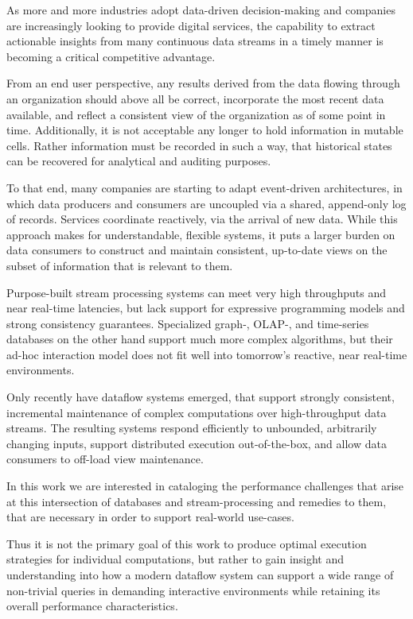 \documentclass[../index.tex]{subfiles}
\begin{document}
As more and more industries adopt data-driven decision-making and
companies are increasingly looking to provide digital services, the
capability to extract actionable insights from many continuous data
streams in a timely manner is becoming a critical competitive
advantage.

From an end user perspective, any results derived from the data
flowing through an organization should above all be correct,
incorporate the most recent data available, and reflect a consistent
view of the organization as of some point in time. Additionally, it is
not acceptable any longer to hold information in mutable cells. Rather
information must be recorded in such a way, that historical states can
be recovered for analytical and auditing purposes.

To that end, many companies are starting to adapt event-driven
architectures, in which data producers and consumers are uncoupled via
a shared, append-only log of records. Services coordinate reactively,
via the arrival of new data. While this approach makes for
understandable, flexible systems, it puts a larger burden on data
consumers to construct and maintain consistent, up-to-date views on
the subset of information that is relevant to them.

Purpose-built stream processing systems can meet very high throughputs
and near real-time latencies, but lack support for expressive
programming models and strong consistency guarantees. Specialized
graph-, OLAP-, and time-series databases on the other hand support
much more complex algorithms, but their ad-hoc interaction model does
not fit well into tomorrow's reactive, near real-time environments.

Only recently have dataflow systems emerged, that support strongly
consistent, incremental maintenance of complex computations over
high-throughput data streams. The resulting systems respond
efficiently to unbounded, arbitrarily changing inputs, support
distributed execution out-of-the-box, and allow data consumers to
off-load view maintenance.

In this work we are interested in cataloging the performance
challenges that arise at this intersection of databases and
stream-processing and remedies to them, that are necessary in order to
support real-world use-cases.

Thus it is not the primary goal of this work to produce optimal
execution strategies for individual computations, but rather to gain
insight and understanding into how a modern dataflow system can
support a wide range of non-trivial queries in demanding interactive
environments while retaining its overall performance characteristics.
\end{document}
